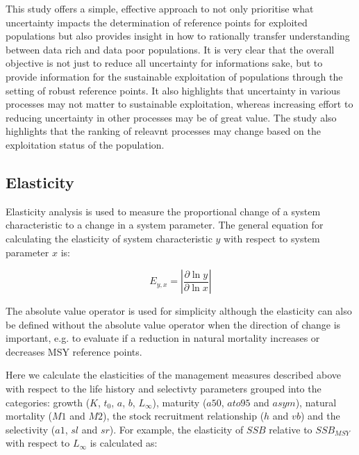\documentclass{pnastwo}
\begin{document}
\begin{article}
This study offers a simple, effective approach to not only prioritise what uncertainty
impacts the determination of reference points for exploited populations but also
provides insight in how to rationally transfer understanding between data rich
and data poor populations. It is very clear that the overall objective is not just
to reduce all uncertainty for informations sake, but to provide information for
the sustainable exploitation of populations through the setting of robust reference
points. It also highlights that uncertainty in various processes may not matter
to sustainable exploitation, whereas increasing effort to reducing uncertainty
in other processes may be of great value. The study also highlights that the ranking
of releavnt processes may change based on the exploitation status of the population.




\begin{materials}


\subsection{Elasticity}
Elasticity analysis is used to measure the proportional change of a system characteristic to a 
change in a system parameter. The general equation for calculating the elasticity of 
system characteristic $y$ with respect to system parameter $x$ is:

\begin{equation}
E_{y,x} = \left| \frac{\partial \ln y}{\partial \ln x} \right|        
%
\end{equation} 

The absolute value operator is used for simplicity although the elasticity can also be defined without the absolute value operator when the direction of 
change is important, e.g. to evaluate if a reduction in natural mortality increases or decreases MSY reference points.	

Here we calculate the elasticities of the management measures described above with respect to the life history and selectivty parameters grouped into the
categories: growth ($K$, $t_0$, $a$, $b$, $L_{\infty}$), maturity ($a50$, $ato95$ and $asym$), natural mortality ($M1$ and $M2$), the stock recruitment
relationship ($h$ and $vb$) and the selectivity ($a1$, $sl$ and $sr$). For example, the elasticity of $SSB$ relative to $SSB_{MSY}$ with respect to $L_{\infty}$ is calculated as:


\end{materials}
\end{article}
\end{document}
